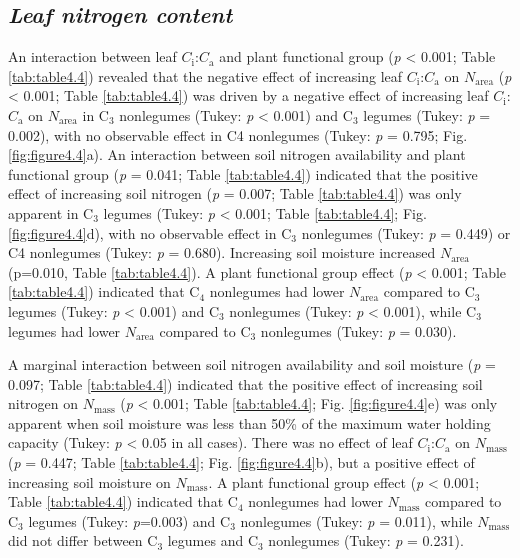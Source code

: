 \subsection{\textit{Leaf nitrogen content}}
An interaction between leaf $C_\mathrm{i}$:$C_\mathrm{a}$ and plant functional group (\textit{p} < 0.001; Table \ref{tab:table4.4}) revealed that the negative effect of increasing leaf $C_\mathrm{i}$:$C_\mathrm{a}$ on $N_\mathrm{area}$ (\textit{p} < 0.001; Table \ref{tab:table4.4}) was driven by a negative effect of increasing leaf $C_\mathrm{i}$:$C_\mathrm{a}$ on $N_\mathrm{area}$ in C$_3$ nonlegumes (Tukey: \textit{p} < 0.001) and C$_3$ legumes (Tukey: \textit{p} = 0.002), with no observable effect in C4 nonlegumes (Tukey: \textit{p} = 0.795; Fig. \ref{fig:figure4.4}a). An interaction between soil nitrogen availability and plant functional group (\textit{p} = 0.041; Table \ref{tab:table4.4}) indicated that the positive effect of increasing soil nitrogen (\textit{p} = 0.007; Table \ref{tab:table4.4}) was only apparent in C$_3$ legumes (Tukey: \textit{p} < 0.001; Table \ref{tab:table4.4}; Fig. \ref{fig:figure4.4}d), with no observable effect in C$_3$ nonlegumes (Tukey: \textit{p} = 0.449) or C4 nonlegumes (Tukey: \textit{p} = 0.680). Increasing soil moisture increased $N_\mathrm{area}$ (p=0.010, Table \ref{tab:table4.4}). A plant functional group effect (\textit{p} < 0.001; Table \ref{tab:table4.4}) indicated that C$_4$ nonlegumes had lower $N_\mathrm{area}$ compared to C$_3$ legumes (Tukey: \textit{p} < 0.001) and C$_3$ nonlegumes (Tukey: \textit{p} < 0.001), while C$_3$ legumes had lower $N_\mathrm{area}$ compared to C$_3$ nonlegumes (Tukey: \textit{p} = 0.030).

A marginal interaction between soil nitrogen availability and soil moisture (\textit{p} = 0.097; Table \ref{tab:table4.4}) indicated that the positive effect of increasing soil nitrogen on $N_\mathrm{mass}$ (\textit{p} < 0.001; Table \ref{tab:table4.4}; Fig. \ref{fig:figure4.4}e) was only apparent when soil moisture was less than 50\% of the maximum water holding capacity (Tukey: \textit{p} < 0.05 in all cases). There was no effect of leaf $C_\mathrm{i}$:$C_\mathrm{a}$ on $N_\mathrm{mass}$ (\textit{p} = 0.447; Table \ref{tab:table4.4}; Fig. \ref{fig:figure4.4}b), but a positive effect of increasing soil moisture on $N_\mathrm{mass}$. A plant functional group effect (\textit{p} < 0.001; Table \ref{tab:table4.4}) indicated that C$_4$ nonlegumes had lower $N_\mathrm{mass}$ compared to C$_3$ legumes (Tukey: \textit{p}=0.003) and C$_3$ nonlegumes (Tukey: \textit{p} = 0.011), while $N_\mathrm{mass}$ did not differ between C$_3$ legumes and C$_3$ nonlegumes (Tukey: \textit{p} = 0.231).

